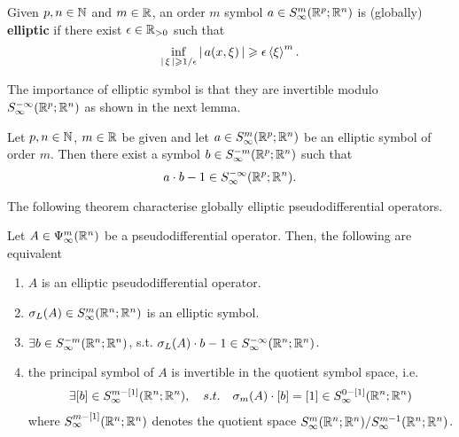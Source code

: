 \documentclass{article}
\begin{document}
\begin{fdefinition}
    Given $p, n \in \N$ and $m \in \R$, an order $m$ symbol $a \in S^m_\infty(\R^p; \R^n)$ is (globally) \textbf{elliptic} if there exist $\epsilon \in \R_{>0}$ such that 
    \[
    \inf_{\abs{\xi} \geq 1/\epsilon} \abs{a(x, \xi)} \geq \epsilon \sym[\xi]^m. 
    \]
\end{fdefinition}

The importance of elliptic symbol is that they are invertible modulo $S^{-\infty}_\infty(\R^p; \R^n)$ as shown in the next lemma. 

\begin{flemma}
    Let $p, n \in \N$, $m \in \R$ be given and let $a \in S^m_\infty(\R^p; \R^n)$ be an elliptic symbol of order $m$. Then there exist a symbol $b \in S^{-m}_\infty(\R^p; \R^n)$ such that 
    \[
    a \cdot b - 1 \in S^{-\infty}_\infty(\R^p; \R^n). 
    \]
\end{flemma}

The following theorem characterise globally elliptic pseudodifferential operators. 
\begin{ftheorem}
    Let $A \in \Psi^{m}_{\infty}(\R^n)$ be a pseudodifferential operator. Then, the following are equivalent
    \begin{enumerate}
        \item $A$ is an elliptic pseudodifferential operator.
        
        \item $\sigma_L(A) \in S^{m}_\infty(\R^{n}; \R^n)$ is an elliptic symbol.
        
        \item $\exists b \in S^{- m}_\infty(\R^{n}; \R^n)$, s.t. $\sigma_L(A) \cdot b -1 \in S^{-\infty }_\infty(\R^{n}; \R^n)$. 
        
        \item the principal symbol of $A$ is invertible in the quotient symbol space, i.e. 
        \begin{align*}
        \exists [b] \in S^{m - [1]}_\infty(\R^{n}; \R^n), \quad s.t. \quad \sigma_m(A) \cdot [b] = [1] \in S^{0 - [1]}_\infty(\R^{n}; \R^n)
        \end{align*}
        where $S^{m-[1]}_\infty(\R^{n}; \R^n)$ denotes the quotient space $S^{m}_\infty(\R^{n}; \R^n) / S^{m -1}_\infty(\R^{n}; \R^n)$. 
        
    \end{enumerate}
\end{ftheorem}
\end{document}
